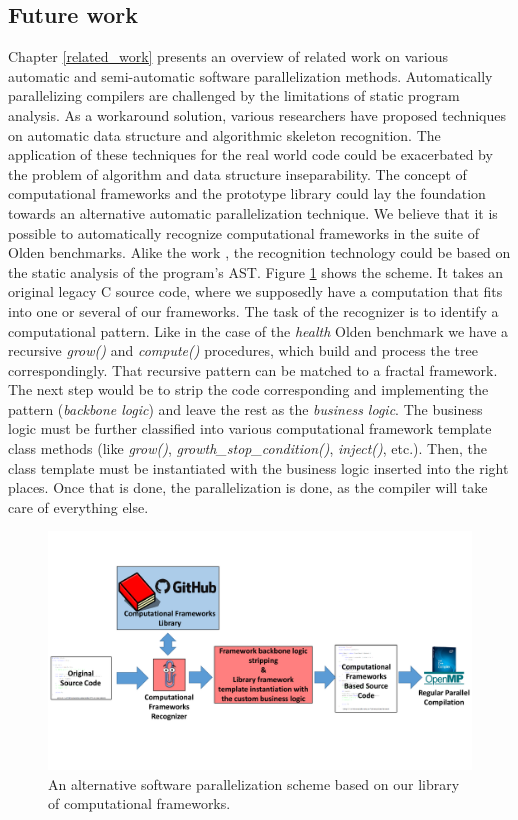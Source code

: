 \subsection{Future work}
\label{frameworks_fw}
\quad Chapter \ref{related_work} presents an overview of related work on various automatic and semi-automatic software parallelization methods. Automatically parallelizing compilers are challenged by the limitations of static program analysis. As a workaround solution, various researchers have proposed techniques on automatic data structure and algorithmic skeleton recognition. The application of these techniques for the real world code could be exacerbated by the problem of algorithm and data structure inseparability.\newline\null
\quad The concept of computational frameworks and the prototype library could lay the foundation towards an alternative automatic parallelization technique. We believe that it is possible to automatically recognize computational frameworks in the suite of Olden benchmarks. Alike the work \cite{skeletons-static}, the recognition technology could be based on the static analysis of the program's AST. Figure \ref{fig:parallelization_scheme} shows the scheme. It takes an original legacy C source code, where we supposedly have a computation that fits into one or several of our frameworks. The task of the recognizer is to identify a computational pattern. Like in the case of the \textit{health} Olden benchmark we have a recursive \textit{grow()} and \textit{compute()} procedures, which build and process the tree correspondingly. That recursive pattern can be matched to a fractal framework. The next step would be to strip the code corresponding and implementing the pattern (\textit{backbone logic}) and leave the rest as the \textit{business logic}. The business logic must be further classified into various computational framework template class methods (like \textit{grow()}, \textit{growth\_stop\_condition()}, \textit{inject()}, etc.). Then, the class template must be instantiated with the business logic inserted into the right places. Once that is done, the parallelization is done, as the compiler will take care of everything else.
\begin{figure}[!htb]
\includegraphics[width=1.0\textwidth]{images/parallelization_scheme.pdf}
\caption{An alternative software parallelization scheme based on our library of computational frameworks.}
\label{fig:parallelization_scheme}
\end{figure}\newline\null
